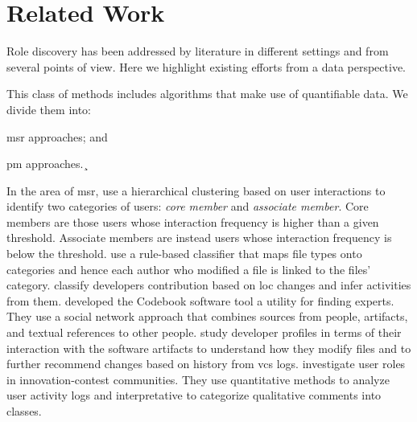\section{Related Work}
Role discovery has been addressed by literature in different settings and from several points of view. Here we highlight existing efforts from a data perspective.


This class of methods includes algorithms that make use of quantifiable data. We divide them into: 
\begin{inparaenum}[\itshape a)]
   \item \gls*{msr} approaches; and
   \item \gls*{pm} approaches.¸
\end{inparaenum}

In the area of \gls*{msr}, \cite{Yu.LiguoRamaswamy.2007} use a hierarchical clustering based on user interactions to identify two categories of users: \emph{core member} and \emph{associate member}. Core members are those users whose interaction frequency is higher than a given threshold. Associate members are instead users whose interaction frequency is below the threshold.
\cite{Alonso2008} use a rule-based classifier that maps file types onto categories and hence each author who modified a file is linked to the files' category. \cite{gousios2008measuring} classify developers contribution based on \gls*{loc} changes and infer activities from them. \cite{Begel2010} developed the Codebook software tool a utility for finding experts. They use a social network approach that combines sources from people, artifacts, and textual references to other people. 
\cite{Ying2014} study developer profiles in terms of their interaction with the software artifacts to understand how they modify files and to further recommend changes based on history from \gls*{vcs} logs. \cite{Fuller2014a} investigate user roles in innovation-contest communities. They use quantitative methods to analyze user activity logs and interpretative to categorize qualitative comments into classes. 


